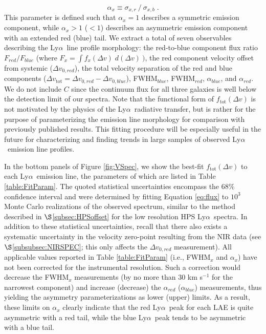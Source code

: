 \documentclass{emulateapj}
\newcommand{\lya}{Ly$\alpha$}
\begin{document}
\begin{equation}\label{eq:skew}
\alpha_{x} \equiv \sigma_{x,r}\: /\: \sigma_{x,b}\; .
\end{equation}
This parameter is defined such that $\alpha_{x} = 1$ describes a symmetric emission component, while $\alpha_{x} > 1$ ($< 1$) describes an asymmetric emission component with an extended red (blue) tail. We extract a total of seven observables describing the \lya\ line profile morphology: the red-to-blue component flux ratio $F_{red} / F_{blue}$ (where $F_{x} = \int f_{x}(\Delta v)\; d(\Delta v)\:)$, the red component velocity offset from systemic ($\Delta v_{0,red}$), the total velocity separation of the red and blue components ($\Delta v_{\mathrm{tot}} = \Delta v_{0,red} - \Delta v_{0,blue}$), FWHM$_{blue}$, FWHM$_{red}$, $\alpha_{blue}$, and $\alpha_{red}$. We do not include $C$ since the continuum flux for all three galaxies is well below the detection limit of our spectra. Note that the functional form of $f_{\mathrm{tot}}(\Delta v)$ is not motivated by the physics of the \lya\ radiative transfer, but is rather for the purpose of parameterizing the emission line morphology for comparison with previously published results. This fitting procedure will be especially useful in the future for characterizing and finding trends in large samples of observed \lya\ emission line profiles.

In the bottom panels of Figure \ref{fig:VSpec}, we show the best-fit $f_{\mathrm{tot}}(\Delta v)$ to each \lya\ emission line, the parameters of which are listed in Table \ref{table:FitParam}. The quoted statistical uncertainties encompass the 68\% confidence interval and were determined by fitting Equation \ref{eq:flux} to $10^{3}$ Monte Carlo realizations of the observed spectrum, similar to the method described in $\S$\ref{subsec:HPSoffset} for the low resolution HPS \lya\ spectra. In addition to these statistical uncertainties, recall that there also exists a systematic uncertainty in the velocity zero-point resulting from the NIR data (see $\S$\ref{subsubsec:NIRSPEC}; this only affects the $\Delta v_{0,red}$ measurement). All applicable values reported in Table \ref{table:FitParam} (i.e., FWHM$_{x}$ and $\alpha_{x}$) have not been corrected for the instrumental resolution. Such a correction would decrease the FWHM$_{x}$ measurements (by no more than 30 km s$^{-1}$ for the narrowest component) and increase (decrease) the $\alpha_{red}$ ($\alpha_{blue}$) measurements, thus yielding the asymmetry parameterizations as lower (upper) limits. As a result, these limits on $\alpha_{x}$ clearly indicate that the red \lya\ peak for each LAE is quite asymmetric with a red tail, while the blue \lya\ peak tends to be asymmetric with a blue tail.
\end{document}
